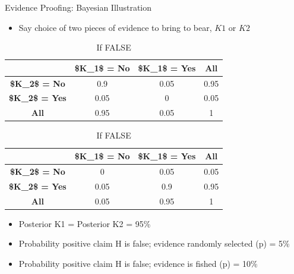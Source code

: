 \documentclass[
  11pt,
  ignorenonframetext,
]{beamer}
\providecommand{\tightlist}{%
  \setlength{\itemsep}{0pt}\setlength{\parskip}{0pt}}\usepackage{longtable,booktabs,array}
\begin{document}
\begin{frame}{Evidence Proofing: Bayesian Illustration}
\protect\hypertarget{evidence-proofing-bayesian-illustration}{}
\begin{itemize}
\tightlist
\item
  Say choice of two pieces of evidence to bring to bear, \(K1\) or
  \(K2\)
\end{itemize}

\begin{table}

\caption{Likelihoods}\begin{minipage}[t]{0.50\linewidth}
\subcaption{\label{tbl-anonymous-1620458-1}}

{\centering 

\caption{If TRUE }\tabularnewline

\centering
\begin{tabular}{>{}c|c|c|c}
\hline
 & \$K\_1\$ = No & \$K\_1\$ = Yes & All\\
\hline
\textbf{\$K\_2\$ = No} & 0.9 & 0.05 & 0.95\\
\hline
\textbf{\$K\_2\$ = Yes} & 0.05 & 0 & 0.05\\
\hline
\textbf{All} & 0.95 & 0.05 & 1\\
\hline
\end{tabular}

}

\end{minipage}%
%
\begin{minipage}[t]{0.50\linewidth}
\subcaption{\label{tbl-anonymous-1620458-2}}

{\centering 

\caption{If FALSE }\tabularnewline

\centering
\begin{tabular}{>{}c|c|c|c}
\hline
 & \$K\_1\$ = No & \$K\_1\$ = Yes & All\\
\hline
\textbf{\$K\_2\$ = No} & 0 & 0.05 & 0.05\\
\hline
\textbf{\$K\_2\$ = Yes} & 0.05 & 0.9 & 0.95\\
\hline
\textbf{All} & 0.05 & 0.95 & 1\\
\hline
\end{tabular}

}

\end{minipage}%

\end{table}

\begin{itemize}
\tightlist
\item
  Posterior \textbar{} K1 = Posterior \textbar{} K2 = 95\%
\item
  Probability positive claim \textbar{} H is false; evidence randomly
  selected (p) = 5\%
\item
  Probability positive claim \textbar{} H is false; evidence is fished
  (p) = 10\%
\end{itemize}
\end{frame}
\end{document}
